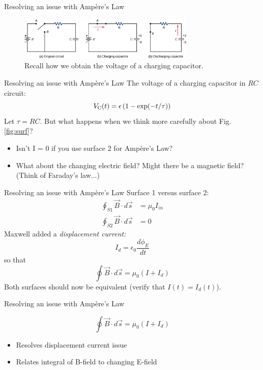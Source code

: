 \documentclass{beamer}
\begin{document}
\begin{frame}{Resolving an issue with  Amp\`{e}re's Law}
\begin{figure}
\centering
\includegraphics[width=0.75\textwidth]{figures/cap.jpeg}
\caption{\label{fig:surf2} Recall how we obtain the voltage of a charging capacitor.}
\end{figure}
\end{frame}

\begin{frame}{Resolving an issue with  Amp\`{e}re's Law}
The voltage of a charging capacitor in $RC$ circuit:
\begin{equation}
V_{\rm C} (t) = \epsilon \left( 1 - \exp(-t/\tau) \right)
\end{equation}
Let $\tau = RC$.  But what happens when we think more carefully about Fig. \ref{fig:surf}?
\begin{itemize}
\item Isn't I = 0 if you use surface 2 for Amp\`{e}re's Law?
\item What about the changing electric field?  Might there be a magnetic field? (Think of Faraday's law...)
\end{itemize}
\end{frame}

\begin{frame}{Resolving an issue with  Amp\`{e}re's Law}
Surface 1 versus surface 2: 
\begin{align}
\oint_{S1} \vec{B} \cdot d\vec{s} &= \mu_0 I_{in} \\
\oint_{S2} \vec{B} \cdot d\vec{s} &= 0
\end{align}
Maxwell added a \textit{displacement current:}
\begin{equation}
I_d = \epsilon_0 \frac{d\phi_E}{dt}
\end{equation}
so that
\begin{equation}
\oint \vec{B} \cdot d\vec{s} = \mu_0 (I + I_d)
\end{equation}
Both surfaces should now be equivalent (verify that $I(t) = I_d (t)$).
\end{frame}

\begin{frame}{Resolving an issue with  Amp\`{e}re's Law}
\begin{tcolorbox}[colback=white,colframe=black!100!black,title=The Maxwell-Amp\`{e}re Law]
\begin{equation}
\oint \vec{B} \cdot d\vec{s} = \mu_0 (I + I_d)
\end{equation}
\end{tcolorbox}
\begin{itemize}
\item Resolves displacement current issue
\item Relates integral of B-field to changing E-field
\end{itemize}
\end{frame}
\end{document}

